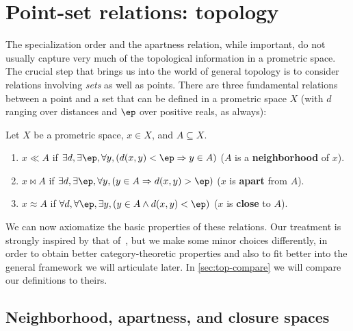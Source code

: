 \documentclass{article}
\def\oapt{\mathrel{\!\not\,\not\lesssim}}
\let\implies\Rightarrow
\begin{document}


\section{Point-set relations: topology}
\label{sec:point-set}
\label{sec:topology}

The specialization order and the apartness relation, while important, do not usually capture very much of the topological information in a prometric space.
The crucial step that brings us into the world of general topology is to consider relations involving \emph{sets} as well as points.
There are three fundamental relations between a point and a set that can be defined in a prometric space $X$ (with $d$ ranging over distances and $\ep$ over positive reals, as always):

\begin{defn}\label{defn:toprels}
  Let $X$ be a prometric space, $x\in X$, and $A\subseteq X$.
  \begin{enumerate}
  \item $x\ll A$ if $\exists d, \exists \ep, \forall y, (d(x,y)<\ep \implies y\in A)$ ($A$ is a \textbf{neighborhood} of $x$).
  \item $x\bowtie A$ if $\exists d, \exists \ep, \forall y, (y\in A \implies d(x,y)>\ep)$ ($x$ is \textbf{apart} from $A$).
  \item $x\approx A$ if $\forall d, \forall \ep, \exists y, (y\in A \land d(x,y)<\ep)$ ($x$ is \textbf{close} to $A$).
  \end{enumerate}
\end{defn}

We can now axiomatize the basic properties of these relations.
Our treatment is strongly inspired by that of~\cite{bridges-vita}, but we make some minor choices differently, in order to obtain better category-theoretic properties and also to fit better into the general framework we will articulate later.
In \cref{sec:top-compare} we will compare our definitions to theirs.


\subsection{Neighborhood, apartness, and closure spaces}
\label{sec:top}
\end{document}
